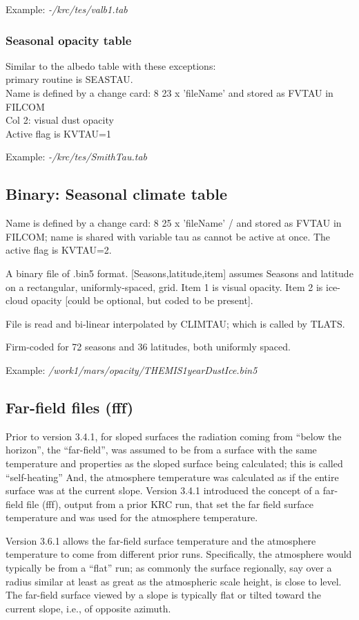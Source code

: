 \documentclass{article}
\newcommand{\qi}{\\ \hspace*{2.em}}      %
\newcommand{\nf}{\textit}  %
\begin{document}
Example: \nf{-/krc/tes/valb1.tab}

\subsubsection{Seasonal opacity table}
Similar to the albedo table with these exceptions:
\qi primary routine is SEASTAU.
\qi Name is defined by a change card:  8 23 x 'fileName' and stored as FVTAU in FILCOM
\qi Col 2: visual dust opacity
\qi Active flag is KVTAU=1

Example: \nf{-/krc/tes/SmithTau.tab} 

\subsection{Binary: Seasonal climate table}
Name is defined by a change card: 8 25 x 'fileName' / and stored as FVTAU in
FILCOM; name is shared with variable tau as cannot be active at once. The active
flag is KVTAU=2.

A binary file of .bin5 format. [Seasons,latitude,item] assumes Seasons and
latitude on a rectangular, uniformly-spaced, grid. Item 1 is visual opacity.
Item 2 is ice-cloud opacity [could be optional, but coded to be present].

File is read and bi-linear interpolated by CLIMTAU; which is called by TLATS. 
  
Firm-coded for 72 seasons and 36 latitudes, both uniformly spaced. 

Example: \nf{/work1/mars/opacity/THEMIS1yearDustIce.bin5}

\subsection{Far-field files (fff) \label{fff} }
Prior to version 3.4.1, for sloped surfaces the radiation coming from ``below
the horizon'', the ``far-field'', was assumed to be from a surface with the same
temperature and properties as the sloped surface being calculated; this is
called ``self-heating'' And, the atmosphere temperature was calculated as if the
entire surface was at the current slope. Version 3.4.1 introduced the concept of
a far-field file (fff), output from a prior KRC run, that set the far field
surface temperature and was used for the atmosphere temperature.

Version 3.6.1 allows the far-field surface temperature and the atmosphere
temperature to come from different prior runs. Specifically, the atmosphere
would typically be from a ``flat'' run; as commonly the surface regionally, say
over a radius similar at least as great as the atmospheric scale height, is
close to level. The far-field surface viewed by a slope is typically flat or
tilted toward the current slope, i.e., of opposite azimuth.
\end{document}
